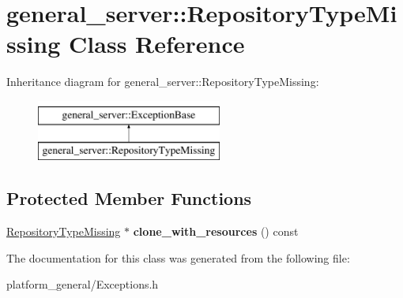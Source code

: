 \hypertarget{classgeneral__server_1_1RepositoryTypeMissing}{\section{general\-\_\-server\-:\-:\-Repository\-Type\-Missing \-Class \-Reference}
\label{classgeneral__server_1_1RepositoryTypeMissing}
}
\-Inheritance diagram for general\-\_\-server\-:\-:\-Repository\-Type\-Missing\-:\begin{figure}[H]
\begin{center}
\leavevmode
\includegraphics[height=2.000000cm]{classgeneral__server_1_1RepositoryTypeMissing}
\end{center}
\end{figure}
\subsection*{\-Protected \-Member \-Functions}
\begin{DoxyCompactItemize}
\item 
\hypertarget{classgeneral__server_1_1RepositoryTypeMissing_aaccba22900fc08bc78b86c41d9abb5bc}{\hyperlink{classgeneral__server_1_1RepositoryTypeMissing}{\-Repository\-Type\-Missing} $\ast$ {\bfseries clone\-\_\-with\-\_\-resources} () const }\label{classgeneral__server_1_1RepositoryTypeMissing_aaccba22900fc08bc78b86c41d9abb5bc}

\end{DoxyCompactItemize}


\-The documentation for this class was generated from the following file\-:\begin{DoxyCompactItemize}
\item 
platform\-\_\-general/\-Exceptions.\-h\end{DoxyCompactItemize}
